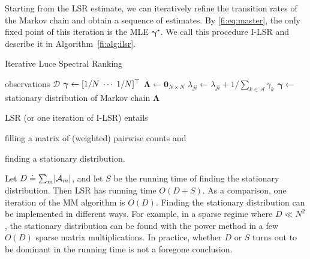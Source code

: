 Starting from the LSR estimate, we can iteratively refine the transition rates of the Markov chain and obtain a sequence of estimates.
By \eqref{fi:eq:master}, the only fixed point of this iteration is the MLE $\bm{\gamma}^\star$.
We call this procedure I-LSR and describe it in Algorithm~\ref{fi:alg:ilsr}.


\begin{algorithm}[ht]
  \caption{Iterative Luce Spectral Ranking}
  \label{fi:alg:ilsr}
  \begin{algorithmic}[1]
    \Require observations $\mathcal{D}$
    \State $\bm{\gamma} \gets [1/N \; \cdots \; 1/N]^\top$
    \Repeat
      \State $\bm{\Lambda} \gets \bm{0}_{N \times N}$
          \State $\lambda_{ji} \gets \lambda_{ji} + 1 / \sum_{k \in \mathcal{A}} \gamma_k$
        \EndFor
      \EndFor
      \State $\bm{\gamma} \gets$ stationary distribution of Markov chain $\bm{\Lambda}$
  \end{algorithmic}
\end{algorithm}

LSR (or one iteration of I-LSR) entails 
\begin{enuminline}
\item filling a matrix of (weighted) pairwise counts and
\item finding a stationary distribution.
\end{enuminline}
Let $D \doteq \sum_{m} \lvert \mathcal{A}_m \rvert$, and let $S$ be the running time of finding the stationary distribution.
Then LSR has running time $O(D + S)$.
As a comparison, one iteration of the MM algorithm \citep{hunter2004mm} is $O(D)$.
Finding the stationary distribution can be implemented in different ways.
For example, in a sparse regime where $D \ll N^2$, the stationary distribution can be found with the power method in a few $O(D)$ sparse matrix multiplications.
In practice, whether $D$ or $S$ turns out to be dominant in the running time is not a foregone conclusion.

